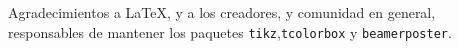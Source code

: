Agradecimientos a \LaTeX, y a los creadores, y comunidad en general, responsables de mantener los paquetes \texttt{tikz},\texttt{tcolorbox} y \texttt{beamerposter}.
